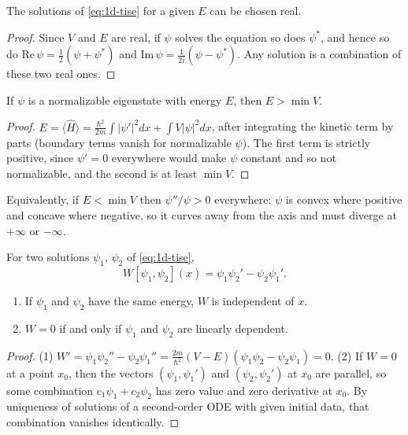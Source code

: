 \begin{theorem}
The solutions of \eqref{eq:1d-tise} for a given $E$ can be chosen real.
\end{theorem}
\begin{proof}
Since $V$ and $E$ are real, if $\psi$ solves the equation so does $\psi^*$, and hence so do $\mathrm{Re}\,\psi = \frac12(\psi+\psi^*)$ and $\mathrm{Im}\,\psi = \frac{1}{2i}(\psi-\psi^*)$. Any solution is a combination of these two real ones.
\end{proof}

\begin{theorem}
If $\psi$ is a normalizable eigenstate with energy $E$, then $E>\min V$.
\end{theorem}
\begin{proof}
$E = \langle\hat{H}\rangle = \frac{\hbar^2}{2m}\int|\psi'|^2dx + \int V|\psi|^2dx$, after integrating the kinetic term by parts (boundary terms vanish for normalizable $\psi$). The first term is strictly positive, since $\psi' = 0$ everywhere would make $\psi$ constant and so not normalizable, and the second is at least $\min V$.
\end{proof}

Equivalently, if $E<\min V$ then $\psi''/\psi>0$ everywhere: $\psi$ is convex where positive and concave where negative, so it curves away from the axis and must diverge at $+\infty$ or $-\infty$.

\begin{definition}[Wronskian]
For two solutions $\psi_1$, $\psi_2$ of \eqref{eq:1d-tise},
\[
    W[\psi_1,\psi_2](x) = \psi_1\psi_2' - \psi_2\psi_1' .
\]
\end{definition}

\begin{theorem}
\leavevmode
\begin{enumerate}
    \item If $\psi_1$ and $\psi_2$ have the same energy, $W$ is independent of $x$.
    \item $W = 0$ if and only if $\psi_1$ and $\psi_2$ are linearly dependent.
\end{enumerate}
\end{theorem}
\begin{proof}
(1) $W' = \psi_1\psi_2'' - \psi_2\psi_1'' = \frac{2m}{\hbar^2}(V-E)(\psi_1\psi_2 - \psi_2\psi_1) = 0$. (2) If $W = 0$ at a point $x_0$, then the vectors $(\psi_1,\psi_1')$ and $(\psi_2,\psi_2')$ at $x_0$ are parallel, so some combination $c_1\psi_1+c_2\psi_2$ has zero value and zero derivative at $x_0$. By uniqueness of solutions of a second-order ODE with given initial data, that combination vanishes identically.
\end{proof}

